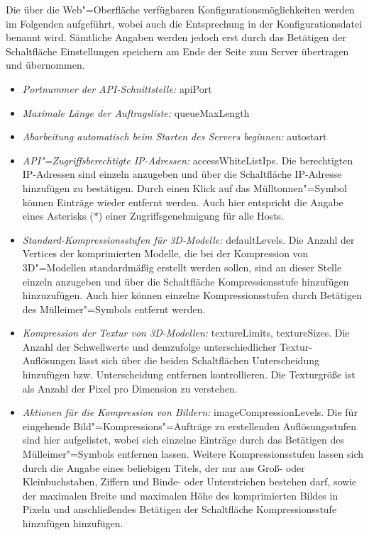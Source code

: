 Die über die Web"=Oberfläche verfügbaren Konfigurationsmöglichkeiten werden im Folgenden aufgeführt, wobei auch die Entsprechung in der Konfigurationsdatei benannt wird. Sämtliche Angaben werden jedoch erst durch das Betätigen der Schaltfläche \glqq{}Einstellungen speichern\grqq{} am Ende der Seite zum Server übertragen und übernommen.
\begin{itemize}
\item \emph{Portnummer der API-Schnittstelle: } {\ttfamily apiPort}
\item \emph{Maximale Länge der Auftragsliste: } {\ttfamily queueMaxLength}
\item \emph{Abarbeitung automatisch beim Starten des Servers beginnen: } {\ttfamily autostart}
\item \emph{API"=Zugriffsberechtigte IP-Adressen: }{\ttfamily access\-White\-List\-Ips}. Die berechtigten IP-Adressen sind einzeln anzugeben und über die Schaltfläche \glqq{}IP-Adresse hinzufügen\grqq{} zu bestätigen. Durch einen Klick auf das Mülltonnen"=Symbol können Einträge wieder entfernt werden. Auch hier entspricht die Angabe eines Asterisks (\glqq{}$\ast$\grqq{}) einer Zugriffsgenehmigung für alle Hosts.
\item \emph{Standard-Kompressionsstufen für 3D-Modelle: }{\ttfamily defaultLevels}. Die Anzahl der Vertices der komprimierten Modelle, die bei der Kompression von 3D"=Modellen standardmäßig erstellt werden sollen, sind an dieser Stelle einzeln anzugeben und über die Schaltfläche \glqq{}Kompressionsstufe hinzufügen\grqq{} hinzuzufügen. Auch hier können einzelne Kompressionsstufen durch Betätigen des Mülleimer"=Symbols entfernt werden.
\item \emph{Kompression der Textur von 3D-Modellen: }{\ttfamily textureLimits}, {\ttfamily textureSizes}. Die Anzahl der Schwellwerte und demzufolge unterschiedlicher Textur-Auflösungen lässt sich über die beiden Schaltflächen \glqq{}Unterscheidung hinzufügen\grqq{} bzw. \glqq{}Unterscheidung entfernen\grqq{} kontrollieren. Die Texturgröße ist als Anzahl der Pixel pro Dimension zu verstehen.
\item \emph{Aktionen für die Kompression von Bildern: }{\ttfamily imageCompressionLevels}. Die für eingehende Bild"=Kompressions"=Aufträge zu erstellenden Auflösungsstufen sind hier aufgelistet, wobei sich einzelne Einträge durch das Betätigen des Mülleimer"=Symbols entfernen lassen. Weitere Kompressionsstufen lassen sich durch die Angabe eines beliebigen Titels, der nur aus Groß- oder Kleinbuchstaben, Ziffern und Binde- oder Unterstrichen bestehen darf, sowie der maximalen Breite und maximalen Höhe des komprimierten Bildes in Pixeln und anschließendes Betätigen der Schaltfläche \glqq{}Kompressionsstufe hinzufügen\grqq{} hinzufügen.
\end{itemize}

